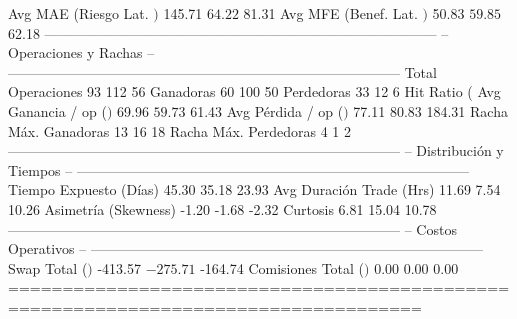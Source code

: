   Avg MAE (Riesgo Lat. $)     $         145.71  $          64.22  $          81.31
  Avg MFE (Benef. Lat. $)     $          50.83  $          59.85  $          62.18
------------------------------------------------------------------------------------
  -- Operaciones y Rachas --
------------------------------------------------------------------------------------
  Total Operaciones                         93               112                56
  Ganadoras                                 60               100                50
  Perdedoras                                33                12                 6
  Hit Ratio (%
  Avg Ganancia / op ($)       $          69.96  $          59.73  $          61.43
  Avg Pérdida / op ($)        $          77.11  $          80.83  $         184.31
  Racha Máx. Ganadoras                      13                16                18
  Racha Máx. Perdedoras                      4                 1                 2
------------------------------------------------------------------------------------
  -- Distribución y Tiempos --
------------------------------------------------------------------------------------
  Tiempo Expuesto (Días)                 45.30             35.18             23.93
  Avg Duración Trade (Hrs)               11.69              7.54             10.26
  Asimetría (Skewness)                   -1.20             -1.68             -2.32
  Curtosis                                6.81             15.04             10.78
------------------------------------------------------------------------------------
  -- Costos Operativos --
------------------------------------------------------------------------------------
  Swap Total ($)              $        -413.57  $        -275.71  $        -164.74
  Comisiones Total ($)        $           0.00  $           0.00  $           0.00
====================================================================================


